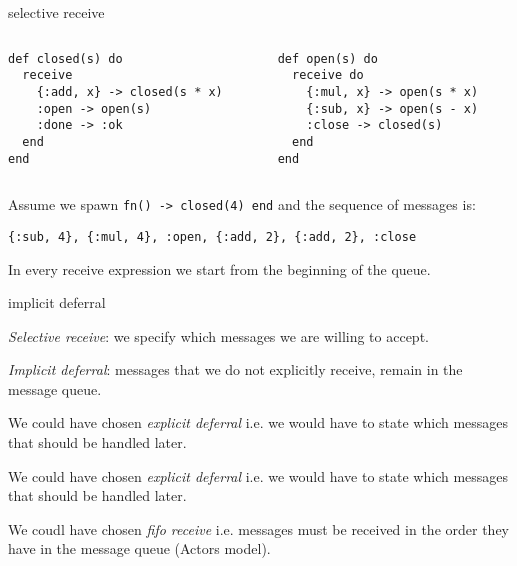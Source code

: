 \begin{frame}[fragile]{selective receive}

\begin{columns}
 \begin{column}{0.5\linewidth}
\begin{verbatim}
def closed(s) do
  receive 
    {:add, x} -> closed(s * x)
    :open -> open(s)
    :done -> :ok
  end
end
\end{verbatim}
 \end{column}
\pause
 \begin{column}{0.5\linewidth}
\begin{verbatim}
def open(s) do
  receive do
    {:mul, x} -> open(s * x)
    {:sub, x} -> open(s - x)
    :close -> closed(s)
  end
end
\end{verbatim}
\end{column}
\end{columns}


\pause\vspace{10pt}

Assume we spawn {\tt fn() -> closed(4) end} and the sequence of messages is:

\vspace{10pt}

{\tt \{:sub, 4\}, \{:mul, 4\}, :open, \{:add, 2\}, \{:add, 2\}, :close}

\pause\vspace{10pt}

In every receive expression we start from the beginning of the queue.

\end{frame}


\begin{frame}{implicit deferral}

{\em Selective receive}: we specify which messages we are willing to accept.

{\em Implicit deferral}: messages that we do not explicitly receive, remain in the message queue.

\pause\vspace{20pt}

We could have chosen {\em explicit deferral} i.e. we would have to
state which messages that should be handled later.

\pause\vspace{20pt}

We could have chosen {\em explicit deferral} i.e. we would have to
state which messages that should be handled later.

\pause\vspace{20pt}

We coudl have chosen {\em fifo receive} i.e. messages must be received
in the order they have in the message queue (Actors model).

\end{frame}

